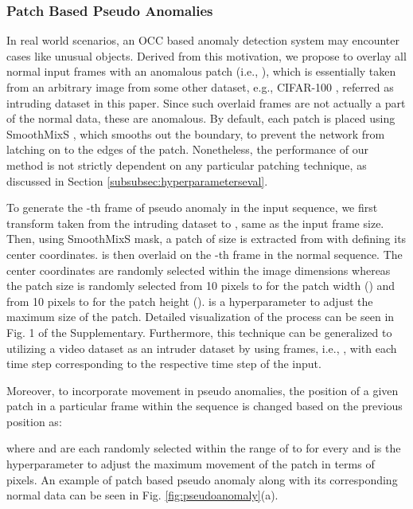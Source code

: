 \documentclass{bmvc2k}
\begin{document}
\vspace{-2mm}
\subsubsection{Patch Based Pseudo Anomalies}
\label{subsubsec:patchbasedpseudoanomalies}

In real world scenarios, an OCC based anomaly detection system may encounter cases like unusual objects. Derived from this motivation, we propose 
to overlay all normal input frames  with an anomalous patch  (i.e., ), which
is essentially taken from an arbitrary image  from some other dataset, e.g., CIFAR-100 \cite{krizhevsky2009learning}, referred as intruding dataset in this paper. Since such overlaid frames are not actually a part of the normal data, these are anomalous. By default, each patch is placed using SmoothMixS \cite{lee2020smoothmix}, which smooths out the boundary, to prevent the network from latching on to the edges of the patch.
Nonetheless, the performance of our method is not strictly dependent on any particular patching technique, as discussed in Section \ref{subsubsec:hyperparameterseval}.

To generate the -th frame of pseudo anomaly  in the input sequence, we first transform  taken from the intruding dataset to , same as the input frame size.
Then, using SmoothMixS mask, a patch  of size  is extracted from  with  defining its center coordinates.
 is then
overlaid on the -th frame  in the normal sequence.
The center coordinates  are randomly selected within the image dimensions whereas the patch size  is randomly selected from 10 pixels to  for the patch width () and from 10 pixels to  for the patch height ().   is a hyperparameter to adjust the maximum size of the patch.
Detailed visualization of the process can be seen in Fig. 1 of the Supplementary. Furthermore, this technique can be generalized to utilizing a video dataset as an intruder dataset by using  frames, i.e., , with each time step corresponding to the respective time step of the input.



Moreover, to incorporate movement in pseudo anomalies, the position of a given patch in a particular frame within the sequence is changed based on the previous position as:

where  and  are each randomly selected within the range of  to  for every  and  is the hyperparameter to adjust the maximum movement of the patch in terms of pixels. An example of patch based pseudo anomaly along with its corresponding normal data can be seen in Fig. \ref{fig:pseudoanomaly}(a).
\end{document}

